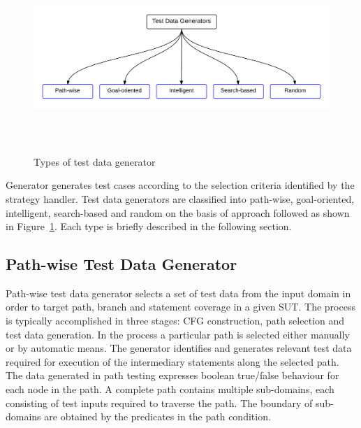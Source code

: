 \bigskip
\begin{figure}[h]
	\centering
	\centerline{\includegraphics[width=16.5cm, height=7.2cm ]{chapter2/Generators.png}}
	\bigskip
	\caption{Types of test data generator}
	\label{testDataGenerators_2}
\end{figure}
\bigskip

Generator generates test cases according to the selection criteria identified by the strategy handler. Test data generators are classified into path-wise, goal-oriented, intelligent, search-based and random on the basis of approach followed as shown in Figure~\ref{testDataGenerators_2}. Each type is briefly described in the following section.

\subsection{Path-wise Test Data Generator} 
\label{sec:pathwise_2}
Path-wise test data generator selects a set of test data from the input domain in order to target path, branch and statement coverage in a given SUT. The process is typically accomplished in three stages: CFG construction, path selection and test data generation. In the process a particular path is selected either manually or by automatic means. The generator identifies and generates relevant test data required for execution of the intermediary statements along the selected path. The data generated in path testing expresses boolean true/false behaviour for each node in the path. A complete path contains multiple sub-domains, each consisting of test inputs required to traverse the path. The boundary of sub-domains are obtained by the predicates in the path condition. %

